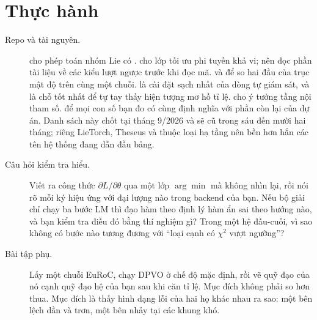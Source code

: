 \documentclass[../../deep_learning.tex]{subfiles}
\begin{document}
\section{Thực hành}
\begin{description}
\item[Repo và tài nguyên.]  cho phép toán nhóm Lie có .  cho lớp tối ưu phi tuyến khả vi; nên đọc phần tài liệu về các kiểu lượt ngược trước khi đọc mã.  và  để so hai đầu của trục mật độ trên cùng một chuỗi.  là cài đặt sạch nhất của dòng tự giám sát, và là chỗ tốt nhất để tự tay thấy hiện tượng mơ hồ tỉ lệ.  cho ý tưởng tầng nội tham số.  để mọi con số bạn đo có cùng định nghĩa với phần còn lại của dự án. Danh sách này chốt tại tháng 9/2026 và sẽ cũ trong sáu đến mười hai tháng; riêng LieTorch, Theseus và  thuộc loại hạ tầng nên bền hơn hẳn các tên hệ thống đang dẫn đầu bảng.
\item[Câu hỏi kiểm tra hiểu.] Viết ra công thức \(\partial L/\partial\theta\) qua một lớp \(\arg\min\) mà không nhìn lại, rồi nói rõ mỗi ký hiệu ứng với đại lượng nào trong backend của bạn. Nếu bộ giải chỉ chạy ba bước LM thì đạo hàm theo định lý hàm ẩn sai theo hướng nào, và bạn kiểm tra điều đó bằng thí nghiệm gì? Trong một hệ đầu-cuối, vì sao không có bước nào tương đương với ``loại cạnh có \(\chi^2\) vượt ngưỡng''?
\item[Bài tập phụ.] Lấy một chuỗi EuRoC, chạy DPVO ở chế độ mặc định, rồi vẽ quỹ đạo của nó cạnh quỹ đạo hệ của bạn sau khi căn tỉ lệ. Mục đích không phải so hơn thua. Mục đích là thấy hình dạng lỗi của hai họ khác nhau ra sao: một bên lệch dần và trơn, một bên nhảy tại các khung khó.
\end{description}
\end{document}
